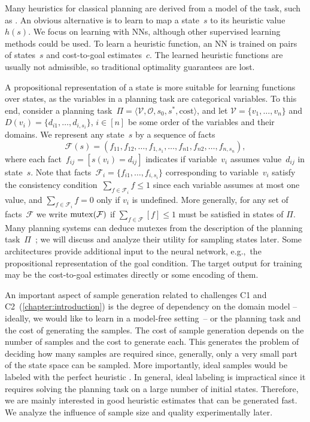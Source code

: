 Many heuristics for classical planning are derived from a model of the task, such as \sas. An obvious alternative is to learn to map a state~$s$ to its heuristic value~$h(s)$. We focus on learning with NNs, although other supervised learning methods could be used. To learn a heuristic function, an NN is trained on pairs of states~$s$ and cost-to-goal estimates~$c$. The learned heuristic functions are usually not admissible, so traditional optimality guarantees are lost.

A propositional representation of a state is more suitable for learning functions over states, as the variables in a planning task are categorical variables. To this end, consider a planning task~$\Pi=\langle\mathcal{V},\mathcal{O},s_0,s^*, \text{cost}\rangle$, and let $\mathcal{V}=\{v_1,\ldots,v_n\}$ and $D(v_i)=\{d_{i1},\ldots,d_{i,s_i}\}$, $i\in[n]$ be some order of the variables and their domains. We represent any state~$s$ by a sequence of facts $$\mathcal{F}(s)=(f_{11},f_{12},\ldots,f_{1,s_1},\ldots,f_{n1},f_{n2},\ldots,f_{n,s_n}),$$ where each fact~$f_{ij}=[s(v_i)=d_{ij}]$ indicates if variable~$v_i$ assumes value~$d_{ij}$ in state~$s$. Note that facts~$\mathcal{F}_i=\{f_{i1},\ldots,f_{i,s_i}\}$ corresponding to variable~$v_i$ satisfy the consistency condition~$\sum_{f\in \mathcal{F}_i} f\leq 1$ since each variable assumes at most one value, and $\sum_{f\in \mathcal{F}_i} f=0$ only if $v_i$ is undefined. More generally, for any set of facts~$\mathcal{F}$ we write $\operatorname{mutex}(\mathcal{F})$ if $\sum_{f\in \mathcal{F}} [f]\leq 1$ must be satisfied in states of $\Pi$. Many planning systems can deduce mutexes from the description of the planning task~$\Pi$~\cite{helmert2009concise}; we will discuss and analyze their utility for sampling states later. Some architectures provide additional input to the neural network, e.g.,~the propositional representation of the goal condition. The target output for training may be the cost-to-goal estimates directly or some encoding of them.

An important aspect of sample generation related to challenges C1 and C2~(\cref{chapter:introduction}) is the degree of dependency on the domain model -- ideally, we would like to learn in a model-free setting~-- or the planning task and the cost of generating the samples. The cost of sample generation depends on the number of samples and the cost to generate each. This generates the problem of deciding how many samples are required since, generally, only a very small part of the state space can be sampled. More importantly, ideal samples would be labeled with the perfect heuristic \hstar. In general, ideal labeling is impractical since it requires solving the planning task on a large number of initial states. Therefore, we are mainly interested in good heuristic estimates that can be generated fast. We analyze the influence of sample size and quality experimentally later.

